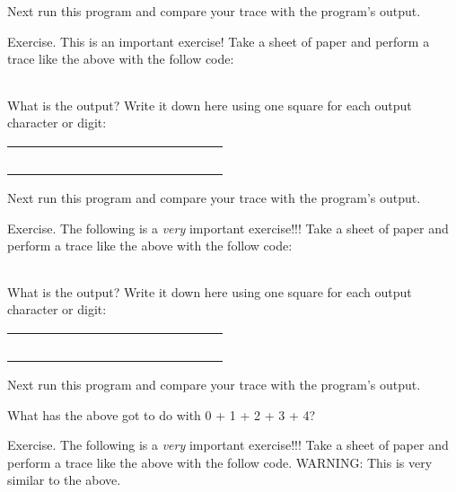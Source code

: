 \documentclass[
]{article}
\begin{document}
Next run this program and compare your trace with the program's output.

Exercise. This is an important exercise! Take a sheet of paper and
perform a trace like the above with the follow code:

\begin{longtable}[]{@{}@{}}
\toprule
\endhead
\bottomrule
\end{longtable}

What is the output? Write it down here using one square for each output
character or digit:

\begin{longtable}[]{@{}lllllllllllllll@{}}
\toprule
\endhead
& & & & & & & & & & & & & &\tabularnewline
& & & & & & & & & & & & & &\tabularnewline
& & & & & & & & & & & & & &\tabularnewline
& & & & & & & & & & & & & &\tabularnewline
& & & & & & & & & & & & & &\tabularnewline
\bottomrule
\end{longtable}

Next run this program and compare your trace with the program's output.

Exercise. The following is a \emph{very} important exercise!!! Take a
sheet of paper and perform a trace like the above with the follow code:

\begin{longtable}[]{@{}@{}}
\toprule
\endhead
\bottomrule
\end{longtable}

What is the output? Write it down here using one square for each output
character or digit:

\begin{longtable}[]{@{}lllllllllllllll@{}}
\toprule
\endhead
& & & & & & & & & & & & & &\tabularnewline
& & & & & & & & & & & & & &\tabularnewline
& & & & & & & & & & & & & &\tabularnewline
& & & & & & & & & & & & & &\tabularnewline
& & & & & & & & & & & & & &\tabularnewline
\bottomrule
\end{longtable}

Next run this program and compare your trace with the program's output.

What has the above got to do with 0 + 1 + 2 + 3 + 4?

Exercise. The following is a \emph{very} important exercise!!! Take a
sheet of paper and perform a trace like the above with the follow code.
WARNING: This is very similar to the above.

\begin{longtable}[]{@{}@{}}
\toprule
\endhead
\bottomrule
\end{longtable}
\end{document}
